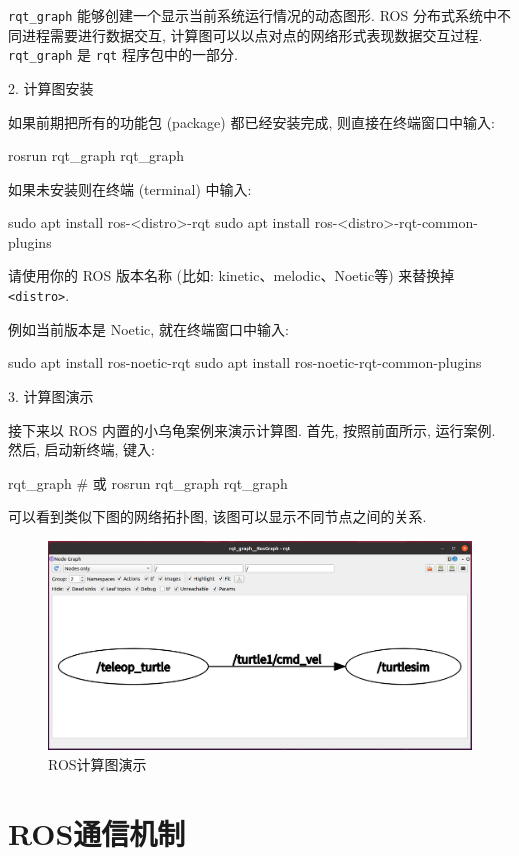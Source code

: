 \documentclass[openany, fontset=windowsold]{ctexbook}
\theoremstyle{kaiti}
\theoremstyle{normal}
\begin{document}
\verb|rqt_graph| 能够创建一个显示当前系统运行情况的动态图形. ROS 分布式系统中不同进程需要进行数据交互, 计算图可以以点对点的网络形式表现数据交互过程. \verb|rqt_graph| 是 \verb|rqt| 程序包中的一部分.

2. 计算图安装

如果前期把所有的功能包 (package) 都已经安装完成, 则直接在终端窗口中输入:

\begin{bash}
  rosrun rqt_graph rqt_graph
\end{bash}

如果未安装则在终端 (terminal) 中输入:

\begin{bash}
  sudo apt install ros-<distro>-rqt
  sudo apt install ros-<distro>-rqt-common-plugins
\end{bash}

请使用你的 ROS 版本名称 (比如: kinetic、melodic、Noetic等) 来替换掉 \verb|<distro>|.

例如当前版本是 Noetic, 就在终端窗口中输入:

\begin{bash}
  sudo apt install ros-noetic-rqt
  sudo apt install ros-noetic-rqt-common-plugins
\end{bash}

3. 计算图演示

接下来以 ROS 内置的小乌龟案例来演示计算图. 首先, 按照前面所示, 运行案例. 然后, 启动新终端, 键入: 

\begin{bash}
  rqt_graph # 或
  rosrun rqt_graph rqt_graph
\end{bash}

可以看到类似下图的网络拓扑图, 该图可以显示不同节点之间的关系.

\begin{figure}[!ht]
  \centering
  \includegraphics[width=.7\textwidth]{rqt_computing_graph.png}
  \caption{ROS计算图演示}
  \label{fig:rqt_computing_graph}
\end{figure}

\chapter{ROS通信机制}
\label{chapter:ros_communication}
\end{document}
